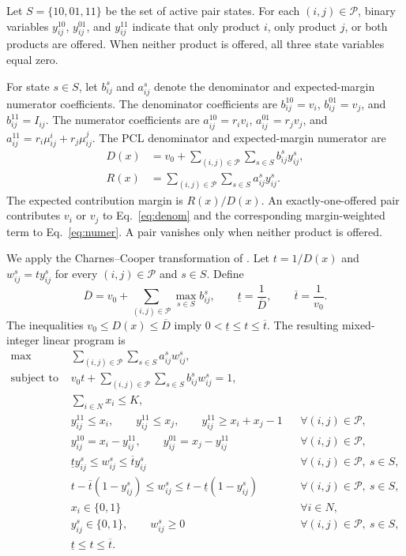 \documentclass[10pt]{article}
\begin{document}
Let $S=\{10,01,11\}$ be the set of active pair states. For each $(i,j)\in\mathcal P$, binary variables $y_{ij}^{10}$, $y_{ij}^{01}$, and $y_{ij}^{11}$ indicate that only product $i$, only product $j$, or both products are offered. When neither product is offered, all three state variables equal zero.

For state $s\in S$, let $b_{ij}^s$ and $a_{ij}^s$ denote the denominator and expected-margin numerator coefficients. The denominator coefficients are $b_{ij}^{10}=v_i$, $b_{ij}^{01}=v_j$, and $b_{ij}^{11}=I_{ij}$. The numerator coefficients are $a_{ij}^{10}=r_iv_i$, $a_{ij}^{01}=r_jv_j$, and $a_{ij}^{11}=r_i\mu_{ij}^i+r_j\mu_{ij}^j$.
The PCL denominator and expected-margin numerator are
\begin{align}
D(x)
&=
v_0+
\sum_{(i,j)\in\mathcal P}
\sum_{s\in S}
b_{ij}^s y_{ij}^s,
\label{eq:denom}\\
R(x)
&=
\sum_{(i,j)\in\mathcal P}
\sum_{s\in S}
a_{ij}^s y_{ij}^s.
\label{eq:numer}
\end{align}
The expected contribution margin is $R(x)/D(x)$. An exactly-one-offered pair contributes $v_i$ or $v_j$ to Eq.~\eqref{eq:denom} and the corresponding margin-weighted term to Eq.~\eqref{eq:numer}. A pair vanishes only when neither product is offered.

We apply the Charnes--Cooper transformation of \citet{charnes1962}. Let $t=1/D(x)$ and $w_{ij}^s=t y_{ij}^s$ for every $(i,j)\in\mathcal P$ and $s\in S$. Define
\begin{equation}
\overline D
=
v_0+
\sum_{(i,j)\in\mathcal P}
\max_{s\in S} b_{ij}^s,
\qquad
\underline t=\frac{1}{\overline D},
\qquad
\overline t=\frac{1}{v_0}.
\label{eq:tbounds}
\end{equation}
The inequalities $v_0\le D(x)\le\overline D$ imply $0<\underline t\le t\le\overline t$. The resulting mixed-integer linear program is
\begin{align}
\max\quad
&
\sum_{(i,j)\in\mathcal P}
\sum_{s\in S}
a_{ij}^s w_{ij}^s,
\label{eq:milpobj}\\
\text{subject to}\quad
&
v_0t+
\sum_{(i,j)\in\mathcal P}
\sum_{s\in S}
b_{ij}^s w_{ij}^s
=
1,
\label{eq:normalize}\\
&
\sum_{i\in N}x_i\le K,
\label{eq:cardinality}\\
&
y_{ij}^{11}\le x_i,\qquad
y_{ij}^{11}\le x_j,\qquad
y_{ij}^{11}\ge x_i+x_j-1
&&
\forall (i,j)\in\mathcal P,
\label{eq:and}\\
&
y_{ij}^{10}=x_i-y_{ij}^{11},\qquad
y_{ij}^{01}=x_j-y_{ij}^{11}
&&
\forall (i,j)\in\mathcal P,
\label{eq:states}\\
&
\underline t y_{ij}^s
\le
w_{ij}^s
\le
\overline t y_{ij}^s
&&
\forall (i,j)\in\mathcal P,\ s\in S,
\label{eq:scaleone}\\
&
t-\overline t(1-y_{ij}^s)
\le
w_{ij}^s
\le
t-\underline t(1-y_{ij}^s)
&&
\forall (i,j)\in\mathcal P,\ s\in S,
\label{eq:scaletwo}\\
&
x_i\in\{0,1\}
&&
\forall i\in N,
\label{eq:domainX}\\
&
y_{ij}^s\in\{0,1\},\qquad
w_{ij}^s\ge0
&&
\forall (i,j)\in\mathcal P,\ s\in S,
\label{eq:domainY}\\
&
\underline t\le t\le\overline t.
\label{eq:domainT}
\end{align}
\end{document}
